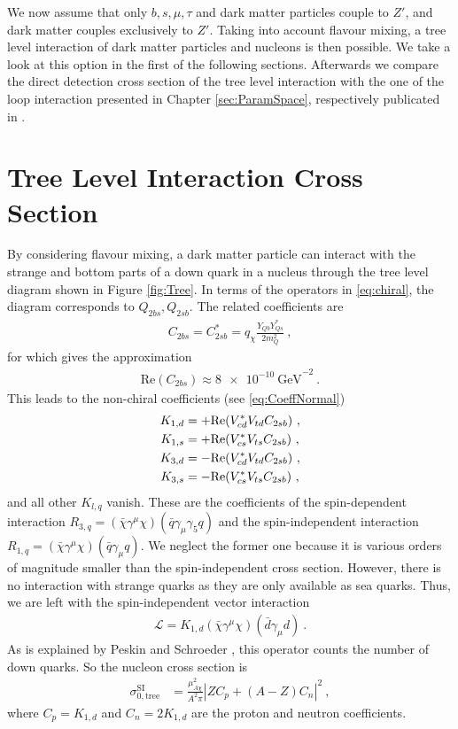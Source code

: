 We now assume that only $b,s,\mu,\tau$ and dark matter particles couple to $Z'$, and dark matter couples exclusively to $Z'$. Taking into account flavour mixing, a tree level interaction of dark matter particles and nucleons is then possible. We take a look at this option in the first of the following sections. Afterwards we compare the direct detection cross section of the tree level interaction with the one of the loop interaction presented in Chapter \ref{sec:ParamSpace}, respectively publicated in \cite{Z}.

\section{Tree Level Interaction Cross Section}
By considering flavour mixing, a dark matter particle can interact with the strange and bottom parts of a down quark in a nucleus through the tree level diagram shown in Figure \ref{fig:Tree}. In terms of the operators in \eqref{eq:chiral}, the diagram corresponds to $Q_{2bs},Q_{2sb}$. The related coefficients are
\begin{align}
	C_{2bs} = C_{2sb}^* = q_\chi\frac{Y_{Qb}Y_{Qs}^*}{2m_Q^2} \ ,
\end{align}
for which \cite{InColour} gives the approximation
\begin{align}\label{eq:BoundC}
\text{Re}\left(C_{2bs}\right) \approx \SI{8e-10}{\giga\electronvolt}^{-2} \ .
\end{align}
This leads to the non-chiral coefficients (see \eqref{eq:CoeffNormal})
\begin{align}
	K_{1,d} &= +\text{Re}(V_{cd}^*V_{td}C_{2sb}) \ , \notag \\
	K_{1,s} &= +\text{Re}(V_{cs}^*V_{ts}C_{2sb}) \ , \notag \\
	K_{3,d} &= -\text{Re}(V_{cd}^*V_{td}C_{2sb}) \ , \notag \\
	K_{3,s} &= -\text{Re}(V_{cs}^*V_{ts}C_{2sb}) \ ,
\end{align}
and all other $K_{l,q}$ vanish. These are the coefficients of the spin-dependent interaction $R_{3,q} = (\bar{\chi}\gamma^\mu\chi)(\bar{q}\gamma_\mu\gamma_5 q)$ and the spin-independent interaction $R_{1,q} = (\bar{\chi}\gamma^\mu\chi)(\bar{q}\gamma_\mu q)$. We neglect the former one because it is various orders of magnitude smaller than the spin-independent cross section. However, there is no interaction with strange quarks as they are only available as sea quarks. Thus, we are left with the spin-independent vector interaction
\begin{align}
	\mathcal{L} = K_{1,d}(\bar{\chi}\gamma^\mu\chi)(\bar{d}\gamma_\mu d) \ .
\end{align}
As is explained by Peskin and Schroeder \cite[Chapter 7]{Supersymmetric}, this operator counts the number of down quarks. So the nucleon cross section is
\begin{align}\label{eq:Tree}
	\sigma_{0,\text{tree}}^\text{SI} &= \frac{\mu_{A\chi}^2}{A^2\pi}\left|ZC_p +(A-Z)C_n\right|^2 \ ,
\end{align}
where $C_p = K_{1,d}$ and $C_n = 2K_{1,d}$ are the proton and neutron coefficients.


